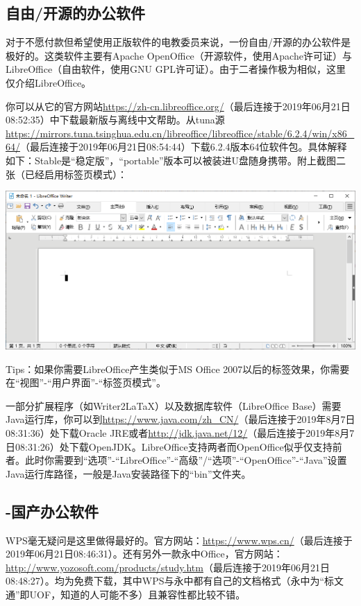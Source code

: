 \subsection{自由/开源的办公软件}
对于不愿付款但希望使用正版软件的电教委员来说，一份自由/开源的办公软件是极好的。这类软件主要有Apache OpenOffice（开源软件，使用Apache许可证）与LibreOffice（自由软件，使用GNU GPL许可证）。由于二者操作极为相似，这里仅介绍LibreOffice。\par
你可以从它的官方网站\url{https://zh-cn.libreoffice.org/}（最后连接于2019年06月21日08:52:35）中下载最新版与离线中文帮助。从tuna源\url{https://mirrors.tuna.tsinghua.edu.cn/libreoffice/libreoffice/stable/6.2.4/win/x86_64/}（最后连接于2019年06月21日08:54:44）下载6.2.4版本64位软件包。具体解释如下：Stable是“稳定版”，“portable”版本可以被装进U盘随身携带。附上截图二张（已经启用标签页模式）：
\begin{center}
	\includegraphics[scale=0.35]{pic/loffice_wr}
\end{center} \par
Tips：如果你需要LibreOffice产生类似于MS Office 2007以后的标签效果，你需要在“视图”-“用户界面”-“标签页模式”。\par
一部分扩展程序（如Writer2LaTaX）以及数据库软件（LibreOffice Base）需要Java运行库，你可以到\url{https://www.java.com/zh_CN/}（最后连接于2019年8月7日08:31:36）处下载Oracle JRE或者\url{http://jdk.java.net/12/}（最后连接于2019年8月7日08:31:26）处下载OpenJDK。LibreOffice支持两者而OpenOffice似乎仅支持前者。此时你需要到“选项”-“LibreOffice”-“高级”/“选项”-“OpenOffice”-“Java”设置Java运行库路径，一般是Java安装路径下的“bin”文件夹。
\subsection{-国产办公软件}
WPS毫无疑问是这里做得最好的。官方网站：\url{https://www.wps.cn/}（最后连接于2019年06月21日08:46:31）。还有另外一款永中Office，官方网站：\url{http://www.yozosoft.com/products/study.htm}（最后连接于2019年06月21日08:48:27）。均为免费下载，其中WPS与永中都有自己的文档格式（永中为“标文通”即UOF，知道的人可能不多）且兼容性都比较不错。
